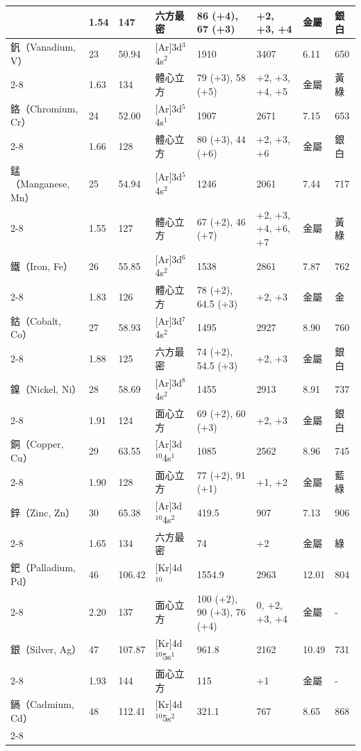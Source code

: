 \documentclass[a4paper,12pt]{report}
\begin{document}
\begin{longtable}[c]{|p{}|p{}|p{}|p{}|p{}|p{}|p{}|p{}|}
& 1.54 & 147 & 六方最密 & 86 (+4), 67 (+3) & +2, +3, +4 & 金屬 & 銀白\\\hline
釩（Vanadium, V） & 23 & 50.94 & [Ar]3d$^3$4s$^2$ & 1910 & 3407 & 6.11 & 650\\\cline{2-8}
& 1.63 & 134 & 體心立方 & 79 (+3), 58 (+5) & +2, +3, +4, +5 & 金屬 & 黃綠\\\hline
鉻（Chromium, Cr） & 24 & 52.00 & [Ar]3d$^5$4s$^1$ & 1907 & 2671 & 7.15 & 653\\\cline{2-8}
& 1.66 & 128 & 體心立方 & 80 (+3), 44 (+6) & +2, +3, +6 & 金屬 & 銀白\\\hline
錳（Manganese, Mn） & 25 & 54.94 & [Ar]3d$^5$4s$^2$ & 1246 & 2061 & 7.44 & 717\\\cline{2-8}
& 1.55 & 127 & 體心立方 & 67 (+2), 46 (+7) & +2, +3, +4, +6, +7 & 金屬 & 黃綠\\\hline
鐵（Iron, Fe） & 26 & 55.85 & [Ar]3d$^6$4s$^2$ & 1538 & 2861 & 7.87 & 762\\\cline{2-8}
& 1.83 & 126 & 體心立方 & 78 (+2), 64.5 (+3) & +2, +3 & 金屬 & 金\\\hline
鈷（Cobalt, Co） & 27 & 58.93 & [Ar]3d$^7$4s$^2$ & 1495 & 2927 & 8.90 & 760\\\cline{2-8}
& 1.88 & 125 & 六方最密 & 74 (+2), 54.5 (+3) & +2, +3 & 金屬 & 銀白\\\hline
鎳（Nickel, Ni） & 28 & 58.69 & [Ar]3d$^8$4s$^2$ & 1455 & 2913 & 8.91 & 737\\\cline{2-8}
& 1.91 & 124 & 面心立方 & 69 (+2), 60 (+3) & +2, +3 & 金屬 & 銀白\\\hline
銅（Copper, Cu） & 29 & 63.55 & [Ar]3d$^{10}$4s$^1$ & 1085 & 2562 & 8.96 & 745\\\cline{2-8}
& 1.90 & 128 & 面心立方 & 77 (+2), 91 (+1) & +1, +2 & 金屬 & 藍綠\\\hline
鋅（Zinc, Zn） & 30 & 65.38 & [Ar]3d$^{10}$4s$^2$ & 419.5 & 907 & 7.13 & 906\\\cline{2-8}
& 1.65 & 134 & 六方最密 & 74 & +2 & 金屬 & 綠\\\hline
鈀（Palladium, Pd） & 46 & 106.42 & [Kr]4d$^{10}$ & 1554.9 & 2963 & 12.01 & 804\\\cline{2-8}
& 2.20 & 137 & 面心立方 & 100 (+2), 90 (+3), 76 (+4) & 0, +2, +3, +4 & 金屬 & -\\\hline
銀（Silver, Ag） & 47 & 107.87 & [Kr]4d$^{10}$5s$^1$ & 961.8 & 2162 & 10.49 & 731\\\cline{2-8}
& 1.93 & 144 & 面心立方 & 115 & +1 & 金屬 & -\\\hline
鎘（Cadmium, Cd） & 48 & 112.41 & [Kr]4d$^{10}$5s$^2$ & 321.1 & 767 & 8.65 & 868\\\cline{2-8}

\end{longtable}
\end{document}
